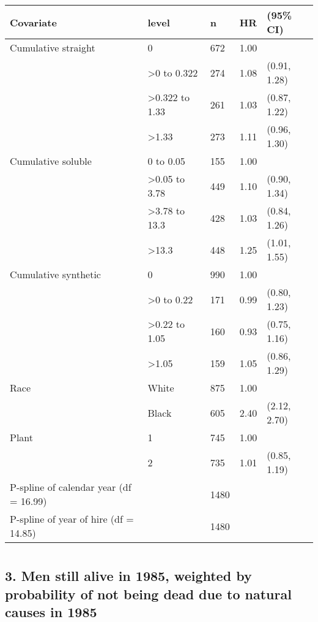 \documentclass[10pt,]{article}
\begin{document}
\begin{table}[H]
\centering
\begin{tabular}{lllll}
  \toprule
Covariate & level & n & HR & (95\% CI) \\ 
  \midrule
Cumulative straight & 0 & 672 & 1.00 &  \\ 
   & >0 to 0.322 & 274 & 1.08 & (0.91, 1.28) \\ 
   & >0.322 to 1.33 & 261 & 1.03 & (0.87, 1.22) \\ 
   & >1.33 & 273 & 1.11 & (0.96, 1.30) \\ 
  Cumulative soluble & 0 to 0.05 & 155 & 1.00 &  \\ 
   & >0.05 to 3.78 & 449 & 1.10 & (0.90, 1.34) \\ 
   & >3.78 to 13.3 & 428 & 1.03 & (0.84, 1.26) \\ 
   & >13.3 & 448 & 1.25 & (1.01, 1.55) \\ 
  Cumulative synthetic & 0 & 990 & 1.00 &  \\ 
   & >0 to 0.22 & 171 & 0.99 & (0.80, 1.23) \\ 
   & >0.22 to 1.05 & 160 & 0.93 & (0.75, 1.16) \\ 
   & >1.05 & 159 & 1.05 & (0.86, 1.29) \\ 
  Race & White & 875 & 1.00 &  \\ 
   & Black & 605 & 2.40 & (2.12, 2.70) \\ 
  Plant & 1 & 745 & 1.00 &  \\ 
   & 2 & 735 & 1.01 & (0.85, 1.19) \\ 
  P-spline of calendar year (df = 16.99) &  & 1480 &  &  \\ 
  P-spline of year of hire (df = 14.85) &  & 1480 &  &  \\ 
   \bottomrule
\end{tabular}
\end{table}

\hypertarget{section-5}{%
\section{}\label{section-5}}

\hypertarget{men-still-alive-in-1985-weighted-by-probability-of-not-being-dead-due-to-natural-causes-in-1985}{%
\subsection{3. Men still alive in 1985, weighted by probability of not
being dead due to natural causes in
1985}\label{men-still-alive-in-1985-weighted-by-probability-of-not-being-dead-due-to-natural-causes-in-1985}}
\end{document}
